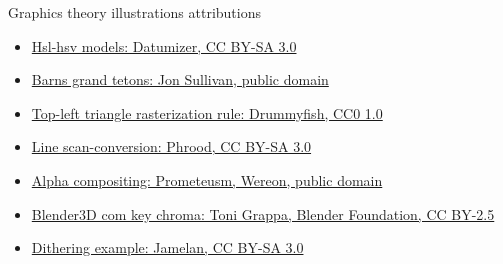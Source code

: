 \begin{frame}{Graphics theory illustrations attributions}
  \small
  \begin{itemize}
  \item \href{https://commons.wikimedia.org/wiki/File:Hsl-hsv_models_b.svg}{Hsl-hsv models: Datumizer, CC BY-SA 3.0}
  \item \href{https://commons.wikimedia.org/wiki/File:Barns_grand_tetons.jpg}{Barns grand tetons: Jon Sullivan, public domain}
  \item \href{https://commons.wikimedia.org/wiki/File:Top-left_triangle_rasterization_rule.gif}{Top-left triangle rasterization rule: Drummyfish, CC0 1.0}
  \item \href{https://commons.wikimedia.org/wiki/File:Line_scan-conversion.svg}{Line scan-conversion: Phrood, CC BY-SA 3.0}
  \item \href{https://commons.wikimedia.org/wiki/File:Alpha_compositing.svg}{Alpha compositing: Prometeusm, Wereon, public domain}
  \item \href{https://commons.wikimedia.org/wiki/File:Blender3D_com_key_chroma.jpg}{Blender3D com key chroma: Toni Grappa, Blender Foundation, CC BY-2.5}
  \item \href{https://en.wikipedia.org/wiki/File:Dithering_example_dithered_web_palette.png}{Dithering example: Jamelan, CC BY-SA 3.0}
  \end{itemize}
\end{frame}
